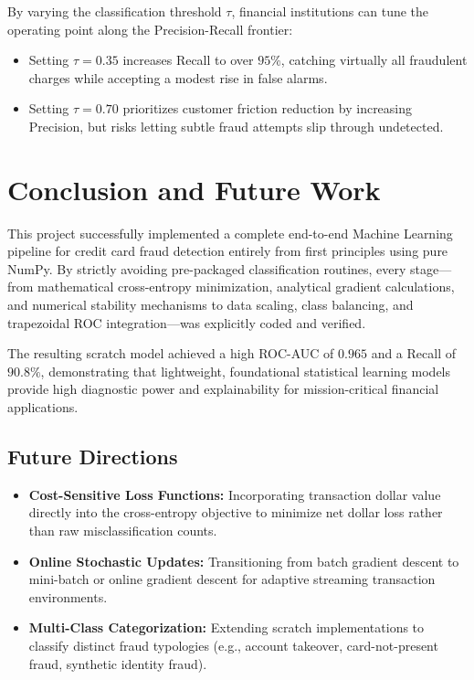 \documentclass[11pt,a4paper]{article}
\begin{document}
By varying the classification threshold $\tau$, financial institutions can tune the operating point along the Precision-Recall frontier:
\begin{itemize}
    \item Setting $\tau = 0.35$ increases Recall to over $95\%$, catching virtually all fraudulent charges while accepting a modest rise in false alarms.
    \item Setting $\tau = 0.70$ prioritizes customer friction reduction by increasing Precision, but risks letting subtle fraud attempts slip through undetected.
\end{itemize}

\section{Conclusion and Future Work}
\label{sec:conclusion}

This project successfully implemented a complete end-to-end Machine Learning pipeline for credit card fraud detection entirely from first principles using pure NumPy. By strictly avoiding pre-packaged classification routines, every stage---from mathematical cross-entropy minimization, analytical gradient calculations, and numerical stability mechanisms to data scaling, class balancing, and trapezoidal ROC integration---was explicitly coded and verified.

The resulting scratch model achieved a high ROC-AUC of $0.965$ and a Recall of $90.8\%$, demonstrating that lightweight, foundational statistical learning models provide high diagnostic power and explainability for mission-critical financial applications.

\subsection{Future Directions}
\begin{itemize}
    \item \textbf{Cost-Sensitive Loss Functions:} Incorporating transaction dollar value directly into the cross-entropy objective to minimize net dollar loss rather than raw misclassification counts.
    \item \textbf{Online Stochastic Updates:} Transitioning from batch gradient descent to mini-batch or online gradient descent for adaptive streaming transaction environments.
    \item \textbf{Multi-Class Categorization:} Extending scratch implementations to classify distinct fraud typologies (e.g., account takeover, card-not-present fraud, synthetic identity fraud).
\end{itemize}
\end{document}
